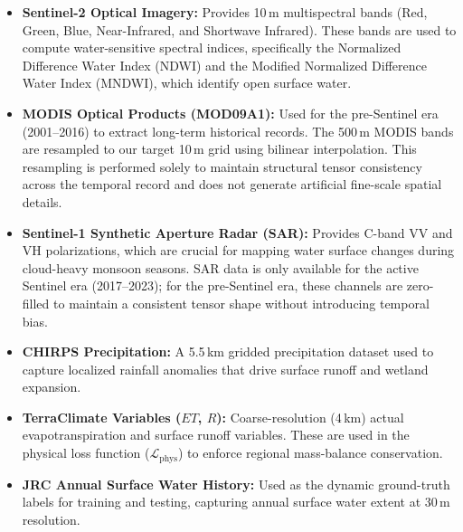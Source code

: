 \documentclass[journal]{IEEEtran}
\begin{document}
\begin{itemize}
    \item \textbf{Sentinel-2 Optical Imagery:} Provides 10\,m multispectral bands (Red, Green, Blue, Near-Infrared, and Shortwave Infrared). These bands are used to compute water-sensitive spectral indices, specifically the Normalized Difference Water Index (NDWI) and the Modified Normalized Difference Water Index (MNDWI), which identify open surface water.
    \item \textbf{MODIS Optical Products (MOD09A1):} Used for the pre-Sentinel era (2001--2016) to extract long-term historical records. The 500\,m MODIS bands are resampled to our target 10\,m grid using bilinear interpolation. This resampling is performed solely to maintain structural tensor consistency across the temporal record and does not generate artificial fine-scale spatial details.
    \item \textbf{Sentinel-1 Synthetic Aperture Radar (SAR):} Provides C-band VV and VH polarizations, which are crucial for mapping water surface changes during cloud-heavy monsoon seasons. SAR data is only available for the active Sentinel era (2017--2023); for the pre-Sentinel era, these channels are zero-filled to maintain a consistent tensor shape without introducing temporal bias.
    \item \textbf{CHIRPS Precipitation:} A 5.5\,km gridded precipitation dataset used to capture localized rainfall anomalies that drive surface runoff and wetland expansion.
    \item \textbf{TerraClimate Variables ($ET$, $R$):} Coarse-resolution (4\,km) actual evapotranspiration and surface runoff variables. These are used in the physical loss function ($\mathcal{L}_{\text{phys}}$) to enforce regional mass-balance conservation.
    \item \textbf{JRC Annual Surface Water History:} Used as the dynamic ground-truth labels for training and testing, capturing annual surface water extent at 30\,m resolution.
\end{itemize}
\end{document}
